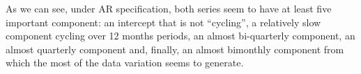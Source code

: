 \documentclass[12pt]{article} %
\begin{document}
As we can see, under AR specification, both series seem to have at least five important component: an intercept that is not ``cycling'', a relatively slow component cycling over 12 months periods, an almost bi-quarterly component, an almost quarterly component and, finally, an almost bimonthly component from which the most of the data variation seems to generate.



\label{Bibliography}

 


\end{document}
